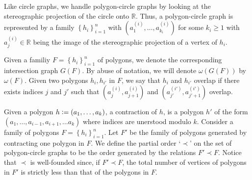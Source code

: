 \documentclass[12pt]{article}
\theoremstyle{definition}
\newcommand{\defeq}{\vcentcolon=}
\begin{document}
    Like circle graphs, we
    handle polygon-circle graphs by looking
    at the stereographic projection
    of the circle onto $\mathbb{R}$.
    Thus, a polygon-circle
    graph is represented by a 
    family $\left\{h_{i}\right\}_{i=1}^{n}$
    with 
    $\left(a_{1}^{\left(i\right)},
    \ldots, a_{k_{i}}^{\left(i\right)}\right)$ 
    for some $k_{i} \geq 1$ 
    with $a^{\left(i\right)}_{j} \in \mathbb{R}$
    being the image of
    the stereographic projection
    of a vertex of $h_{i}$.

    Given a familiy
    $F = \left\{h_{i}\right\}_{i=1}^{n}$ 
    of polygons, we denote
    the corresponding
    intersection graph $G\left(F\right)$.
    By abuse of notation,
    we will denote
    $\omega\left(G\left(F\right)\right)$ 
    by $\omega\left(F\right)$.
    Given two polygons
    $h_{i}, h_{i'}$ in $F$,
    we say that $h_{i}$ and
    $h_{i'}$ overlap 
    if there exists indices 
    $j$ and $j'$ such that
    $\left(a_{j}^{\left(i\right)},
     a_{j+1}^{\left(i\right)}\right)$ 
     and $\left(a_{j'}^{\left(i'\right)},
     a_{j'+1}^{\left(i'\right)}\right)$ 
     overlap.

     Given a polygon
     $h \defeq \left(
     a_{1}, \ldots, a_{k}\right)$,
     a contraction of $h$,
     is a polygon $h'$ 
     of the form
     $\left(a_{1}, \ldots,
     a_{i-1}, a_{i+1}, \ldots
     a_{k}\right)$ 
     where indices are
     unerstood modulo $k$.
     Consider a family of
     polygons
     $F = \left\{h_{i}\right\}_{i=1}^{n}$.
     Let $F'$ be the family
     of polygons generated
     by contracting one
     polygon in $F$.
     We define the partial order
     `$\prec$' on the set
     of polygon-circle graphs
     to be the order generated
     by the relations $F' \prec F$.
     Notice that $\prec$ is
     well-founded since,
     if $F' \prec F$,
     the total number of 
     vertices of polygons in
     $F'$ is strictly less than
     that of the polygons in $F$.
\end{document}
